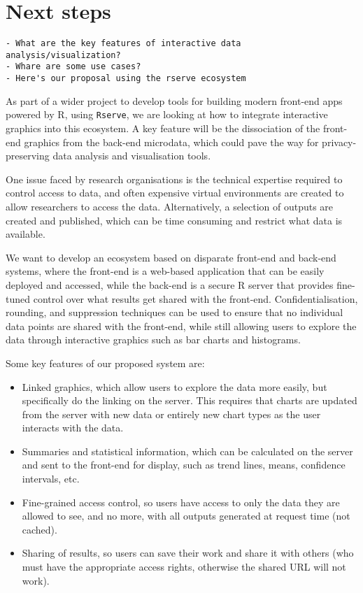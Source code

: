 \documentclass{article}
\newcommand{\pkg}[1]{\texttt{#1}}
\newcommand{\prog}[1]{{\sf #1}}
\newcommand{\R}{\prog{R}}
\begin{document}
\section{Next steps}
\label{sec:requirements}

\begin{verbatim}
- What are the key features of interactive data analysis/visualization?
- Whare are some use cases?
- Here's our proposal using the rserve ecosystem
\end{verbatim}

As part of a wider project to develop tools for building modern front-end apps powered by \R{}, using \pkg{Rserve}, we are looking at how to integrate interactive graphics into this ecosystem.
A key feature will be the dissociation of the front-end graphics from the back-end microdata, which could pave the way for privacy-preserving data analysis and visualisation tools.

One issue faced by research organisations is the technical expertise required to control access to data, and often expensive virtual environments are created to allow researchers to access the data.
Alternatively, a selection of outputs are created and published, which can be time consuming and restrict what data is available.

We want to develop an ecosystem based on disparate front-end and back-end systems, where the front-end is a web-based application that can be easily deployed and accessed, while the back-end is a secure \R{} server that provides fine-tuned control over what results get shared with the front-end.
Confidentialisation, rounding, and suppression techniques can be used to ensure that no individual data points are shared with the front-end, while still allowing users to explore the data through interactive graphics such as bar charts and histograms.

Some key features of our proposed system are:
\begin{itemize}
\item Linked graphics, which allow users to explore the data more easily, but specifically do the linking on the server. This requires that charts are updated from the server with new data or entirely new chart types as the user interacts with the data.
\item Summaries and statistical information, which can be calculated on the server and sent to the front-end for display, such as trend lines, means, confidence intervals, etc.
\item Fine-grained access control, so users have access to only the data they are allowed to see, and no more, with all outputs generated at request time (not cached).
\item Sharing of results, so users can save their work and share it with others (who must have the appropriate access rights, otherwise the shared URL will not work).
\end{itemize}
\end{document}
